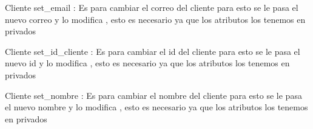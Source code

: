 \documentclass[letterpaper,10pt,spanish]{sphinxmanual}
\begin{document}
\begin{fulllineitems}
\begin{fulllineitems}
\end{fulllineitems}


\begin{fulllineitems}
\label{\detokenize{projects:projects.Clientes.Cliente.set_email}}
\pysigstartsignatures
{}
\pysigstopsignatures
\sphinxAtStartPar
Cliente set\_email : Es para cambiar el correo del cliente para esto se le pasa el nuevo correo y lo modifica , esto es necesario ya que los atributos los tenemos en privados

\end{fulllineitems}


\begin{fulllineitems}
\label{\detokenize{projects:projects.Clientes.Cliente.set_id_cliente}}
\pysigstartsignatures
{}
\pysigstopsignatures
\sphinxAtStartPar
Cliente set\_id\_cliente : Es para cambiar el id del cliente para esto se le pasa el nuevo id y lo modifica , esto es necesario ya que los atributos los tenemos en privados

\end{fulllineitems}


\begin{fulllineitems}
\label{\detokenize{projects:projects.Clientes.Cliente.set_nombre}}
\pysigstartsignatures
{}
\pysigstopsignatures
\sphinxAtStartPar
Cliente set\_nombre : Es para cambiar el nombre del cliente para esto se le pasa el nuevo nombre y lo modifica , esto es necesario ya que los atributos los tenemos en privados

\end{fulllineitems}


\end{fulllineitems}
\end{document}
